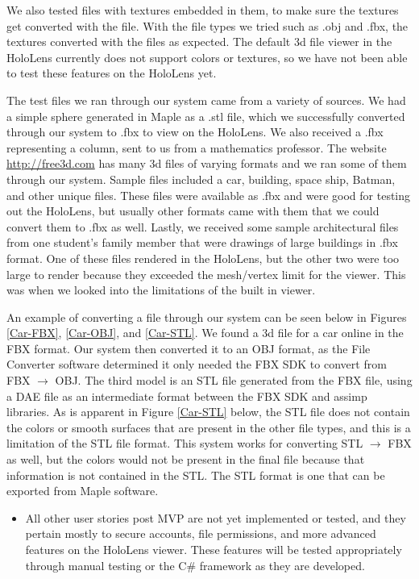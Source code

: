     We also tested files with textures embedded in them, to make sure the textures get converted with the file. With the file types we tried such as .obj and .fbx, the textures converted with the files as expected. The default 3d file viewer in the HoloLens currently does not support colors or textures, so we have not been able to test these features on the HoloLens yet. 

    The test files we ran through our system came from a variety of sources. We had a simple sphere generated in Maple as a .stl file, which we successfully converted through our system to .fbx to view on the HoloLens. We also received a .fbx representing a column, sent to us from a mathematics professor. The website \url{http://free3d.com} has many 3d files of varying formats and we ran some of them through our system. Sample files included a car, building, space ship, Batman, and other unique files. These files were available as .fbx and were good for testing out the HoloLens, but usually other formats came with them that we could convert them to .fbx as well. Lastly, we received some sample architectural files from one student's family member that were drawings of large buildings in .fbx format. One of these files rendered in the HoloLens, but the other two were too large to render because they exceeded the mesh/vertex limit for the viewer. This was when we looked into the limitations of the built in viewer.

    An example of converting a file through our system can be seen below in Figures \ref{Car-FBX}, \ref{Car-OBJ}, and \ref{Car-STL}. 
    We found a 3d file for a car online in the FBX format. 
    Our system then converted it to an OBJ format, as the File Converter software determined it only needed the FBX SDK to convert from FBX $\rightarrow$ OBJ. 
    The third model is an STL file generated from the FBX file, using a DAE file as an intermediate format between the FBX SDK and assimp libraries. 
    As is apparent in Figure \ref{Car-STL} below, the STL file does not contain the colors or smooth surfaces that are present in the other file types, and this is a limitation of the STL file format. 
    This system works for converting STL $\rightarrow$ FBX as well, but the colors would not be present in the final file because that information is not contained in the STL. 
    The STL format is one that can be exported from Maple software.

\begin{itemize} \item All other user stories post MVP are not yet implemented or tested, and they pertain mostly to secure accounts, file permissions, and more advanced features on the HoloLens viewer. 
These features will be tested appropriately through manual testing or the C\# framework as they are developed. \end{itemize}

